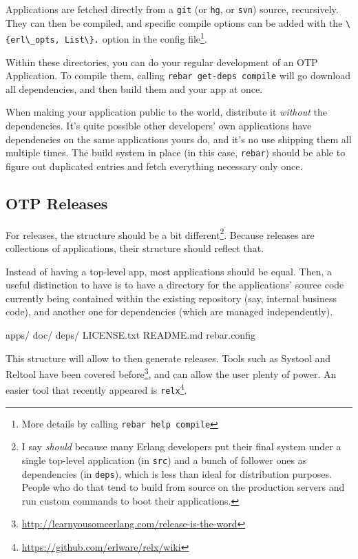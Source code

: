 \documentclass[11pt, oneside]{book}   	%
\newcommand{\filename}[1]{\Verb`#1`}
\newcommand{\app}[1]{\Verb`#1`}
\newcommand{\expression}[1]{\Verb`#1`}
\newcommand{\command}[1]{\Verb`#1`}
\begin{document}
Applications are fetched directly from a \app{git} (or \app{hg}, or \app{svn}) source, recursively. They can then be compiled, and specific compile options can be added with the \expression{\{erl\_opts, List\}.} option in the config file\footnote{More details by calling \command{rebar help compile}}. 

Within these directories, you can do your regular development of an OTP Application. To compile them, calling \command{rebar get-deps compile} will go download all dependencies, and then build them and your app at once.

When making your application public to the world, distribute it \emph{without} the dependencies. It's quite possible other developers' own applications have dependencies on the same applications yours do, and it's no use shipping them all multiple times. The build system in place (in this case, \app{rebar}) should be able to figure out duplicated entries and fetch everything necessary only once.


\subsection{OTP Releases}
\label{subsec:building-otp-releases}

For releases, the structure should be a bit different\footnote{I say \emph{should} because many Erlang developers put their final system under a single top-level application (in \filename{src}) and a bunch of follower ones as dependencies (in \filename{deps}), which is less than ideal for distribution purposes. People who do that tend to build from source on the production servers and run custom commands to boot their applications.}. Because releases are collections of applications, their structure should reflect that.

Instead of having a top-level app, most applications should be equal. Then, a useful distinction to have is to have a directory for the applications' source code currently being contained within the existing repository (say, internal business code), and another one for dependencies (which are managed independently).

\begin{VerbatimText}
apps/
doc/
deps/
LICENSE.txt
README.md
rebar.config
\end{VerbatimText}

This structure will allow to then generate releases. Tools such as Systool and Reltool have been covered before\footnote{\href{http://learnyousomeerlang.com/release-is-the-word}{http://learnyousomeerlang.com/release-is-the-word}}, and can allow the user plenty of power. An easier tool that recently appeared is \app{relx}\footnote{\href{https://github.com/erlware/relx/wiki}{https://github.com/erlware/relx/wiki}}.
\end{document}
